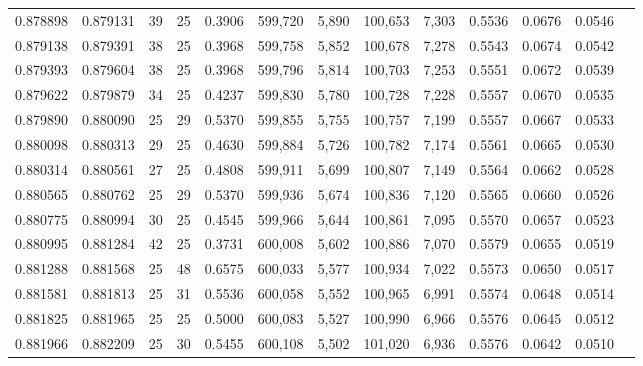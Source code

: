 \begin{tabular}{rrrrrrrrrrrrr}
0.878898 & 0.879131 &    39 &  25 &                                     0.3906 & 599,720 &   5,890 & 100,653 &   7,303 & 0.5536 & 0.0676 & 0.0546 \\
0.879138 & 0.879391 &    38 &  25 &                                     0.3968 & 599,758 &   5,852 & 100,678 &   7,278 & 0.5543 & 0.0674 & 0.0542 \\
0.879393 & 0.879604 &    38 &  25 &                                     0.3968 & 599,796 &   5,814 & 100,703 &   7,253 & 0.5551 & 0.0672 & 0.0539 \\
0.879622 & 0.879879 &    34 &  25 &                                     0.4237 & 599,830 &   5,780 & 100,728 &   7,228 & 0.5557 & 0.0670 & 0.0535 \\
0.879890 & 0.880090 &    25 &  29 &                                     0.5370 & 599,855 &   5,755 & 100,757 &   7,199 & 0.5557 & 0.0667 & 0.0533 \\
0.880098 & 0.880313 &    29 &  25 &                                     0.4630 & 599,884 &   5,726 & 100,782 &   7,174 & 0.5561 & 0.0665 & 0.0530 \\
0.880314 & 0.880561 &    27 &  25 &                                     0.4808 & 599,911 &   5,699 & 100,807 &   7,149 & 0.5564 & 0.0662 & 0.0528 \\
0.880565 & 0.880762 &    25 &  29 &                                     0.5370 & 599,936 &   5,674 & 100,836 &   7,120 & 0.5565 & 0.0660 & 0.0526 \\
0.880775 & 0.880994 &    30 &  25 &                                     0.4545 & 599,966 &   5,644 & 100,861 &   7,095 & 0.5570 & 0.0657 & 0.0523 \\
0.880995 & 0.881284 &    42 &  25 &                                     0.3731 & 600,008 &   5,602 & 100,886 &   7,070 & 0.5579 & 0.0655 & 0.0519 \\
0.881288 & 0.881568 &    25 &  48 &                                     0.6575 & 600,033 &   5,577 & 100,934 &   7,022 & 0.5573 & 0.0650 & 0.0517 \\
0.881581 & 0.881813 &    25 &  31 &                                     0.5536 & 600,058 &   5,552 & 100,965 &   6,991 & 0.5574 & 0.0648 & 0.0514 \\
0.881825 & 0.881965 &    25 &  25 &                                     0.5000 & 600,083 &   5,527 & 100,990 &   6,966 & 0.5576 & 0.0645 & 0.0512 \\
0.881966 & 0.882209 &    25 &  30 &                                     0.5455 & 600,108 &   5,502 & 101,020 &   6,936 & 0.5576 & 0.0642 & 0.0510 \\

\end{tabular}
